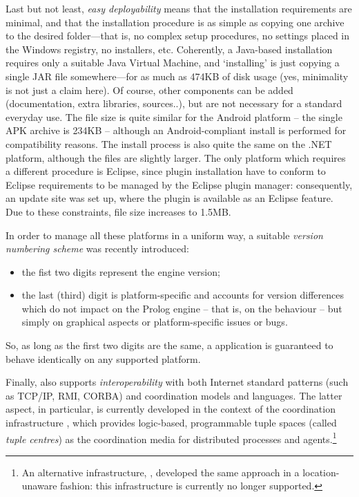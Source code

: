 Last but not least, \textit{easy deployability} means that the installation requirements are minimal, and that the installation procedure is as simple as copying one archive to the desired folder---that is, no complex setup procedures, no settings placed in the Windows registry, no installers, etc.
%
Coherently, a Java-based installation requires only a suitable Java Virtual Machine, and `installing' is just copying a single JAR file somewhere---for as much as 474KB of disk usage (yes, minimality is not just a claim here).
%
Of course, other components can be added (documentation, extra libraries, sources..), but are not necessary for a standard everyday use.
%
The file size is quite similar for the Android platform -- the single APK archive is 234KB -- although an Android-compliant install is performed for compatibility reasons.
%
The install process is also quite the same on the .NET platform, although the files are slightly larger.
%
The only platform which requires a different procedure is Eclipse, since plugin installation have to conform to Eclipse requirements to be managed by the Eclipse plugin manager: consequently, an update site was set up, where the \tuprolog{} plugin is available as an Eclipse feature. Due to these constraints, file size increases to 1.5MB.


In order to manage all these platforms in a uniform way, a suitable \emph{version numbering scheme} was recently introduced:
\begin{itemize}
  \item the fist two digits represent the engine version;
  \item the last (third) digit is platform-specific and accounts for version differences which do not impact on the Prolog engine -- that is, on the
      \tuprolog{} behaviour -- but simply on graphical aspects or platform-specific
      issues or bugs.
\end{itemize}
%
So, as long as the first two digits are the same, a \tuprolog{} application is guaranteed to behave identically on any supported platform.


Finally, \tuprolog{} also supports \textit{interoperability} with both Internet standard patterns (such as TCP/IP, RMI, CORBA) and coordination models and languages.
%
The latter aspect, in particular, is currently developed in the context of the \tucson{} coordination infrastructure \cite{tucson-aamas99,respect-scico2001}, which provides logic-based, programmable tuple spaces (called \emph{tuple centres}) as the coordination media for distributed processes and agents.\footnote{An alternative infrastructure, \luce{} \cite{luce-aamas2001}, developed the same approach in a location-unaware fashion: this infrastructure is currently no longer supported.}


